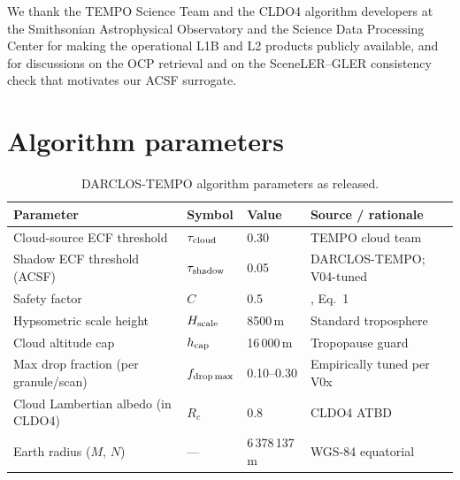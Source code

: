 \documentclass[11pt,a4paper]{article}
\begin{document}
We thank the TEMPO Science Team and the CLDO4 algorithm developers at
the Smithsonian Astrophysical Observatory and the Science Data
Processing Center for making the operational L1B and L2 products
publicly available, and for discussions on the OCP retrieval and on
the SceneLER--GLER consistency check that motivates our ACSF
surrogate.





\appendix

\section{Algorithm parameters}\label{app:params}

\begin{table}[hb]
\centering
\caption{DARCLOS-TEMPO algorithm parameters as released.}
\label{tab:params}
\begin{tabular}{@{}llll@{}}
\toprule
Parameter & Symbol & Value & Source / rationale \\
\midrule
Cloud-source ECF threshold        & $\tau_{\rm cloud}$    & 0.30        & TEMPO cloud team \\
Shadow ECF threshold (ACSF)       & $\tau_{\rm shadow}$   & 0.05        & DARCLOS-TEMPO; V04-tuned \\
Safety factor                     & $C$                   & 0.5         & \citet{trees2022darclos}, Eq.~1 \\
Hypsometric scale height          & $H_{\rm scale}$       & 8500\,m     & Standard troposphere \\
Cloud altitude cap                & $h_{\rm cap}$         & 16\,000\,m  & Tropopause guard \\
Max drop fraction (per granule/scan) & $f_{\rm drop\,max}$ & 0.10--0.30 & Empirically tuned per V0x \\
Cloud Lambertian albedo (in CLDO4)& $R_c$                 & 0.8         & CLDO4 ATBD \citep{wang2025cldo4} \\
Earth radius ($M$, $N$)           & ---                   & 6\,378\,137\,m & WGS-84 equatorial \\
\bottomrule
\end{tabular}
\end{table}
\end{document}
